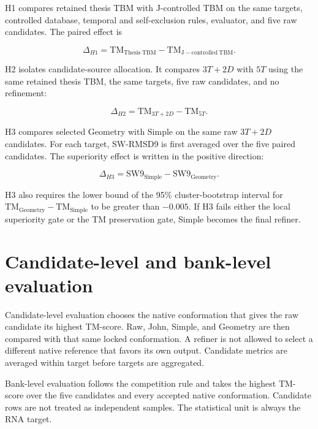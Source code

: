 \documentclass[12pt,a4paper,oneside]{report}
\begin{document}
H1 compares retained thesis TBM with J-controlled TBM on the same targets, controlled
database, temporal and self-exclusion rules, evaluator, and five raw candidates. The
paired effect is

\begin{equation}
\Delta_{H1}=\mathrm{TM}_{\mathrm{Thesis\ TBM}}-
\mathrm{TM}_{\mathrm{J-controlled\ TBM}}.
\end{equation}

H2 isolates candidate-source allocation. It compares $3T+2D$ with $5T$ using the same
retained thesis TBM, the same targets, five raw candidates, and no refinement:

\begin{equation}
\Delta_{H2}=\mathrm{TM}_{3T+2D}-\mathrm{TM}_{5T}.
\end{equation}

H3 compares selected Geometry with Simple on the same raw $3T+2D$ candidates. For
each target, SW-RMSD9 is first averaged over the five paired candidates. The
superiority effect is written in the positive direction:

\begin{equation}
\Delta_{H3}=\mathrm{SW9}_{\mathrm{Simple}}-
\mathrm{SW9}_{\mathrm{Geometry}}.
\end{equation}

H3 also requires the lower bound of the 95\% cluster-bootstrap interval for
$\mathrm{TM}_{\mathrm{Geometry}}-\mathrm{TM}_{\mathrm{Simple}}$ to be greater than
$-0.005$. If H3 fails either the local superiority gate or the TM preservation gate,
Simple becomes the final refiner.

\section{Candidate-level and bank-level evaluation}

Candidate-level evaluation chooses the native conformation that gives the raw
candidate its highest TM-score. Raw, John, Simple, and Geometry are then compared with
that same locked conformation. A refiner is not allowed to select a different native
reference that favors its own output. Candidate metrics are averaged within target
before targets are aggregated.

Bank-level evaluation follows the competition rule and takes the highest TM-score
over the five candidates and every accepted native conformation. Candidate rows are
not treated as independent samples. The statistical unit is always the RNA target.
\end{document}
